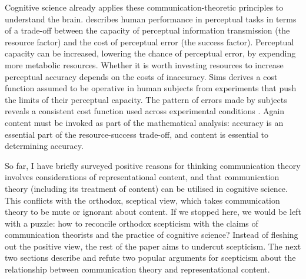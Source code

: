 \documentclass[12pt]{article}
\begin{document}
Cognitive science already applies these communication-theoretic principles to understand the brain.
\citet{sims2016ratedistortion} describes human performance in perceptual tasks in terms of a trade-off between the capacity of perceptual information transmission (the resource factor) and the cost of perceptual error (the success factor).
Perceptual capacity can be increased, lowering the chance of perceptual error, by expending more metabolic resources.
Whether it is worth investing resources to increase perceptual accuracy depends on the costs of inaccuracy.
Sims derives a cost function assumed to be operative in human subjects from experiments that push the limits of their perceptual capacity.
The pattern of errors made by subjects reveals a consistent cost function used across experimental conditions \citep[188]{sims2016ratedistortion}.
Again content must be invoked as part of the mathematical analysis: accuracy is an essential part of the resource-success trade-off, and content is essential to determining accuracy.



So far, I have briefly surveyed positive reasons for thinking communication theory involves considerations of representational content, and that communication theory (including its treatment of content) can be utilised in cognitive science.
This conflicts with the orthodox, sceptical view, which takes communication theory to be mute or ignorant about content.
If we stopped here, we would be left with a puzzle: how to reconcile orthodox scepticism with the claims of communication theorists and the practice of cognitive science?
Instead of fleshing out the positive view, the rest of the paper aims to undercut scepticism.
The next two sections describe and refute two popular arguments for scepticism about the relationship between communication theory and representational content.
\end{document}
